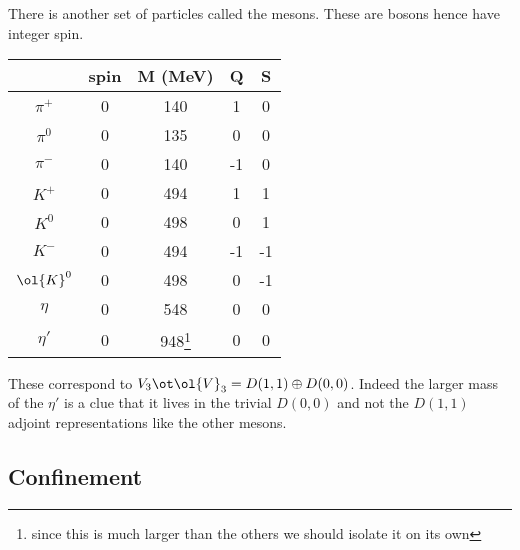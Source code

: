 \documentclass[12pt]{article}
\begin{document}
There is another set of particles called the mesons. These are bosons hence have integer spin.

\begin{center}
\begin{tabular}{||c | c c c c ||} 
 \hline
 & spin & M (MeV) & Q & S \\ [0.5ex] 
 \hline\hline
$\pi^{+}$ & 0 & 140 & 1 & 0 \\ 
 \hline
$\pi^{0}$ & 0 & 135 & 0 & 0 \\ 
 \hline
$\pi^{-}$ & 0 & 140 & -1 & 0 \\ 
 \hline
$K^+$ & 0 & 494 & 1 & 1 \\ 
 \hline
$K^0$ & 0 & 498 & 0 & 1 \\ 
 \hline
$K^-$ & 0 & 494 & -1 & -1 \\ 
 \hline
$\ol{K}^0$ & 0 & 498 & 0 & -1 \\ 
 \hline
$\eta$ & 0 & 548 & 0 & 0 \\ 
 \hline
$\eta'$ & 0 & 948\footnote{since this is much larger than the others we should isolate it on its own} & 0 & 0 \\ 
 \hline
\end{tabular}
\end{center}

These correspond to $V_3 \ot \ol{V}_3 = D(1,1) \oplus D(0,0)$. Indeed the larger mass of the $\eta'$ is a clue that it lives in the trivial $D(0,0)$ and not the $D(1,1)$ adjoint representations like the other mesons.

\subsection{Confinement}
\end{document}
